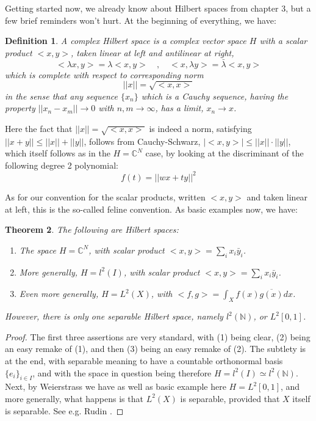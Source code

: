 \documentclass[12pt]{amsbook}
\newtheorem{theorem}{Theorem}[chapter]
\newtheorem{definition}[theorem]{Definition}
\begin{document}
\bigskip

Getting started now, we already know about Hilbert spaces from chapter 3, but a few brief reminders won't hurt. At the beginning of everything, we have:


\begin{definition}
A complex Hilbert space is a complex vector space $H$ with a scalar product $<x,y>$, taken linear at left and antilinear at right,
$$<\lambda x,y>=\lambda<x,y>\quad,\quad <x,\lambda y>=\bar{\lambda}<x,y>$$
which is complete with respect to corresponding norm
$$||x||=\sqrt{<x,x>}$$
in the sense that any sequence $\{x_n\}$ which is a Cauchy sequence, having the property $||x_n-x_m||\to0$ with $n,m\to\infty$, has a limit, $x_n\to x$.
\end{definition}

Here the fact that $||x||=\sqrt{<x,x>}$ is indeed a norm, satisfying $||x+y||\leq||x||+||y||$, follows from Cauchy-Schwarz, $|\!<x,y>\!|\leq||x||\cdot||y||$, which itself follows as in the $H=\mathbb C^N$ case, by looking at the discriminant of the following degree 2 polynomial:
$$f(t)=||wx+ty||^2$$

As for our convention for the scalar products, written $<x,y>$ and taken linear at left, this is the so-called feline convention. As basic examples now, we have:


\begin{theorem}
The following are Hilbert spaces:
\begin{enumerate}
\item The space $H=\mathbb C^N$, with scalar product $<x,y>=\sum_ix_i\bar{y}_i$.

\item More generally, $H=l^2(I)$, with scalar product $<x,y>=\sum_ix_i\bar{y}_i$.

\item Even more generally, $H=L^2(X)$, with $<f,g>=\int_Xf(x)\overline{g(x)}dx$.
\end{enumerate}
However, there is only one separable Hilbert space, namely $l^2(\mathbb N)$, or $L^2[0,1]$.
\end{theorem}

\begin{proof}
The first three assertions are very standard, with (1) being clear, (2) being an easy remake of (1), and then (3) being an easy remake of (2). The subtlety is at the end, with separable meaning to have a countable orthonormal basis $\{e_i\}_{i\in I}$, and with the space in question being therefore $H=l^2(I)\simeq l^2(\mathbb N)$. Next, by Weierstrass we have as well as basic example here $H=L^2[0,1]$, and more generally, what happens is that $L^2(X)$ is separable, provided that $X$ itself is separable. See e.g. Rudin \cite{rud}.
\end{proof}
\end{document}
